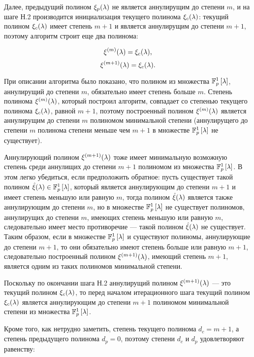 Далее, предыдущий полином $\xi_p (\lambda)$ не является аннулирущим до степени $m$, и на шаге Н.2 производится инициализация текущего
полинома $\xi_c (\lambda)$: текущий полином $\xi_c (\lambda)$ имеет степень $m+1$ и является аннулирущим до степени $m+1$, поэтому
алгоритм строит еще два полинома:

	$$ \xi^{(m)} (\lambda) = \xi_c (\lambda), $$
	$$ \xi^{(m+1)} (\lambda) = \xi_c (\lambda). $$

При описании алгоритма было показано, что полином из множества $\mathbb{F}_p^1 \left [ \lambda \right ]$, аннулирущий до степени $m$, обязательно имеет степень
больше $m$. Степень полинома $\xi^{(m)} (\lambda)$, который построил алгоритм, совпадает со степенью текущего полинома $\xi_c (\lambda)$,
равной $m+1$, поэтому построенный полином $\xi^{(m)} (\lambda)$ является аннулирущим до степени $m$ полиномом минимальной степени
(аннулирущего до степени $m$ полинома степени меньше чем $m+1$ в множестве $\mathbb{F}_p^1 \left [ \lambda \right ]$ не существует).

Аннулирующий полином $\xi^{(m+1)} (\lambda)$ тоже имеет минимальную возможную степень среди аннулищих до степени $m+1$ полиномом из множества
$\mathbb{F}_p^1 \left [ \lambda \right ]$. В этом легко убедиться, если предположить обратное: пусть существует такой полином
$\hat\xi (\lambda) \in \mathbb{F}_p^1 \left [ \lambda \right ]$, который является аннулирующим до степени $m+1$ и имеет степень меньшую или равную $m$, тогда
полином $\hat\xi (\lambda)$ является также аннулирующим до степени $m$, но в множестве $\mathbb{F}_p^1 \left [ \lambda \right ]$ не существует полиномов,
аннулирущих до степени $m$, имеющих степень меньшую или равную $m$, следовательно имеет место противоречие --- такой полином $\hat\xi (\lambda)$
не существует. Таким образом, если в множестве $\mathbb{F}_p^1 \left [ \lambda \right ]$ и существуют полиномы, аннулирующие до степени $m+1$, то они обязательно
имеют степень больше или равную $m+1$, следовательно построенный полином $\xi^{(m+1)} (\lambda)$, имеющий степень $m+1$, является одним
из таких полиномов минимальной степени.

Поскольку по окончании шага Н.2 аннулирущий полином $\xi^{(m+1)} (\lambda)$ --- это текущий полином $\xi_c (\lambda)$, то перед началом
итерационного шага текущий полином $\xi_c (\lambda)$ является аннулирующим до степени $m+1$ полиномом минимальной степени из множества
$\mathbb{F}_p^1 \left [ \lambda \right ]$.

Кроме того, как нетрудно заметить, степень текущего полинома $d_c = m+1$, а степень предыдущего полинома $d_p = 0$, поэтому степени
$d_c$ и $d_p$ удовлетворяют равенству:

